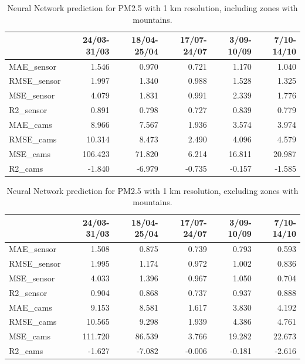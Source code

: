 \begin{table}[H]
\begin{tabular}{lrrrrr}
\toprule
 &  24/03-31/03 &  18/04-25/04 &  17/07-24/07 &  3/09-10/09 &  7/10-14/10 \\
\midrule
 MAE\_sensor &        1.546 &        0.970 &        0.721 &       1.170 &       1.040 \\
RMSE\_sensor &        1.997 &        1.340 &        0.988 &       1.528 &       1.325 \\
 MSE\_sensor &        4.079 &        1.831 &        0.991 &       2.339 &       1.776 \\
  R2\_sensor &        0.891 &        0.798 &        0.727 &       0.839 &       0.779 \\
   MAE\_cams &        8.966 &        7.567 &        1.936 &       3.574 &       3.974 \\
  RMSE\_cams &       10.314 &        8.473 &        2.490 &       4.096 &       4.579 \\
   MSE\_cams &      106.423 &       71.820 &        6.214 &      16.811 &      20.987 \\
    R2\_cams &       -1.840 &       -6.979 &       -0.735 &      -0.157 &      -1.585 \\
\bottomrule
\end{tabular}
\caption{Neural Network prediction for PM2.5 with 1 km resolution, including zones with mountains.}
\end{table}
\begin{table}[H]
\begin{tabular}{lrrrrr}
\toprule
 &  24/03-31/03 &  18/04-25/04 &  17/07-24/07 &  3/09-10/09 &  7/10-14/10 \\
\midrule
 MAE\_sensor &        1.508 &        0.875 &        0.739 &       0.793 &       0.593 \\
RMSE\_sensor &        1.995 &        1.174 &        0.972 &       1.002 &       0.836 \\
 MSE\_sensor &        4.033 &        1.396 &        0.967 &       1.050 &       0.704 \\
  R2\_sensor &        0.904 &        0.868 &        0.737 &       0.937 &       0.888 \\
   MAE\_cams &        9.153 &        8.581 &        1.617 &       3.830 &       4.192 \\
  RMSE\_cams &       10.565 &        9.298 &        1.939 &       4.386 &       4.761 \\
   MSE\_cams &      111.720 &       86.539 &        3.766 &      19.282 &      22.673 \\
    R2\_cams &       -1.627 &       -7.082 &       -0.006 &      -0.181 &      -2.616 \\
\bottomrule
\end{tabular}
\caption{Neural Network prediction for PM2.5 with 1 km resolution, excluding zones with mountains.}
\end{table}
